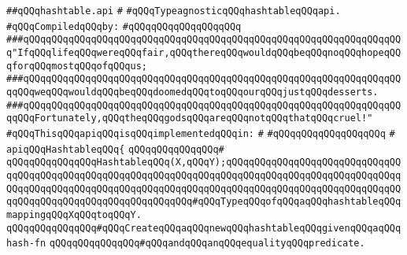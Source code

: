 \label{src/lib/src/hashtable.api}
\verb|##qQQqhashtable.api|\newline
\verb|#|\newline
\verb|#qQQqTypeagnosticqQQqhashtableqQQqapi.|\newline
\newline
\verb|#qQQqCompiledqQQqby:|\newline
\verb|#qQQqqQQqqQQqqQQqqQQq|\newline
\newline
\newline
\newline
\newline
\newline
\verb|###qQQqqQQqqQQqqQQqqQQqqQQqqQQqqQQqqQQqqQQqqQQqqQQqqQQqqQQqqQQqqQQqqQQq"IfqQQqlifeqQQqwereqQQqfair,qQQqthereqQQqwouldqQQqbeqQQqnoqQQqhopeqQQqforqQQqmostqQQqofqQQqus;|\newline
\verb|###qQQqqQQqqQQqqQQqqQQqqQQqqQQqqQQqqQQqqQQqqQQqqQQqqQQqqQQqqQQqqQQqqQQqqQQqweqQQqwouldqQQqbeqQQqdoomedqQQqtoqQQqourqQQqjustqQQqdesserts.|\newline
\verb|###qQQqqQQqqQQqqQQqqQQqqQQqqQQqqQQqqQQqqQQqqQQqqQQqqQQqqQQqqQQqqQQqqQQqqQQqFortunately,qQQqtheqQQqgodsqQQqareqQQqnotqQQqthatqQQqcruel!"|\newline
\newline
\newline
\verb|#qQQqThisqQQqapiqQQqisqQQqimplementedqQQqin:|\newline
\verb|#|\newline
\verb|#qQQqqQQqqQQqqQQqqQQq|\newline
\verb|#|\newline
\verb|apiqQQqHashtableqQQq{|\newline
\verb|qQQqqQQqqQQqqQQq#|\newline
\verb|qQQqqQQqqQQqqQQqHashtableqQQq(X,qQQqY);qQQqqQQqqQQqqQQqqQQqqQQqqQQqqQQqqQQqqQQqqQQqqQQqqQQqqQQqqQQqqQQqqQQqqQQqqQQqqQQqqQQqqQQqqQQqqQQqqQQqqQQqqQQqqQQqqQQqqQQqqQQqqQQqqQQqqQQqqQQqqQQqqQQqqQQqqQQqqQQqqQQqqQQqqQQqqQQqqQQqqQQqqQQqqQQqqQQqqQQqqQQq#qQQqTypeqQQqofqQQqaqQQqhashtableqQQqmappingqQQqXqQQqtoqQQqY.|\newline
\newline
\verb|qQQqqQQqqQQqqQQq#qQQqCreateqQQqaqQQqnewqQQqhashtableqQQqgivenqQQqaqQQqhash-fn|\newline
\verb|qQQqqQQqqQQqqQQq#qQQqandqQQqanqQQqequalityqQQqpredicate.|\newline
